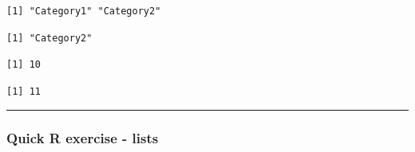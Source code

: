 \documentclass[
]{book}
\newenvironment{Shaded}{\begin{snugshade}}{\end{snugshade}}
\newcommand{\DecValTok}[1]{\textcolor[rgb]{0.00,0.00,0.81}{#1}}
\newcommand{\NormalTok}[1]{#1}
\newcommand{\OtherTok}[1]{\textcolor[rgb]{0.56,0.35,0.01}{#1}}
\newcommand{\SpecialCharTok}[1]{\textcolor[rgb]{0.00,0.00,0.00}{#1}}
\theoremstyle{definition}
\theoremstyle{definition}
\theoremstyle{definition}
\theoremstyle{definition}
\theoremstyle{remark}
\begin{document}
\begin{verbatim}
[1] "Category1" "Category2"
\end{verbatim}

\begin{Shaded}
\end{Shaded}

\begin{verbatim}
[1] "Category2"
\end{verbatim}

\begin{Shaded}
\end{Shaded}

\begin{verbatim}
[1] 10
\end{verbatim}

\begin{Shaded}
\end{Shaded}

\begin{verbatim}
[1] 11
\end{verbatim}

\begin{center}\rule{0.5\linewidth}{0.5pt}\end{center}

\hypertarget{quick-r-exercise---lists}{%
\subsubsection*{\texorpdfstring{\textbf{Quick R exercise - lists}}{Quick R exercise - lists}}\label{quick-r-exercise---lists}}
\end{document}
